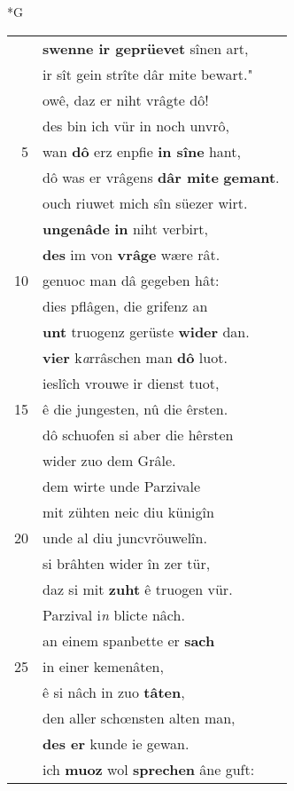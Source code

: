 \documentclass[8pt,a4paper,notitlepage]{article}
\begin{document}
\begin{table}[ht]
\begin{minipage}[t]{0.5\linewidth}
\small
\begin{center}*G
\end{center}
\begin{tabular}{rl}
 & \textbf{swenne ir geprüevet} sînen art,\\ 
 & ir sît gein strîte dâr mite bewart."\\ 
 & owê, daz er niht vrâgte dô!\\ 
 & des bin ich vür in noch unvrô,\\ 
5 & wan \textbf{dô} erz enpfie \textbf{in sîne} hant,\\ 
 & dô was er vrâgens \textbf{dâr mite} \textbf{gemant}.\\ 
 & ouch riuwet mich sîn süezer wirt.\\ 
 & \textbf{ungenâde} \textbf{in} niht verbirt,\\ 
 & \textbf{des} im von \textbf{vrâge} wære rât.\\ 
10 & genuoc man dâ gegeben hât:\\ 
 & dies pflâgen, die grifenz an\\ 
 & \textbf{unt} truogenz gerüste \textbf{wider} dan.\\ 
 & \textbf{vier} k\textit{a}rrâschen man \textbf{dô} luot.\\ 
 & ieslîch vrouwe ir dienst tuot,\\ 
15 & ê die jungesten, nû die êrsten.\\ 
 & dô schuofen si aber die hêrsten\\ 
 & wider zuo dem Grâle.\\ 
 & dem wirte unde Parzivale\\ 
 & mit zühten neic diu künigîn\\ 
20 & unde al diu juncvröuwelîn.\\ 
 & si brâhten wider în zer tür,\\ 
 & daz si mit \textbf{zuht} ê truogen vür.\\ 
 & Parzival i\textit{n} blicte nâch.\\ 
 & an einem spanbette er \textbf{sach}\\ 
25 & in einer kemenâten,\\ 
 & ê si nâch in zuo \textbf{tâten},\\ 
 & den aller schœnsten alten man,\\ 
 & \textbf{des er} kunde ie gewan.\\ 
 & ich \textbf{muoz} wol \textbf{sprechen} âne guft:\\ 

\end{tabular}
\end{minipage}
\end{table}
\end{document}
